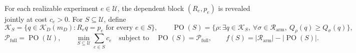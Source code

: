 For each realizable experiment \(e\in\mathcal U\), the dependent block \((R_e,p_e)\) is revealed jointly at cost \(c_e>0\). For \(S\subseteq\mathcal U\), define \[\mathcal K_S=\{q\in\mathcal K_D(m_D):R_eq=p_e\text{ for every }e\in S\},\qquad \operatorname{PO}(S)=\{\rho:\exists q\in\mathcal K_S,\ \forall\sigma\in\mathcal R_{\mathrm{arm}},\ Q_\rho(q)\ge Q_\sigma(q)\},\] \[\mathcal P_{\mathrm{full}}=\operatorname{PO}(\mathcal U),\qquad \min_{S\subseteq\mathcal U}\sum_{e\in S}c_e\quad\text{subject to}\quad\operatorname{PO}(S)=\mathcal P_{\mathrm{full}},\qquad f(S)=\lvert\mathcal R_{\mathrm{arm}}\rvert-\lvert\operatorname{PO}(S)\rvert.\]